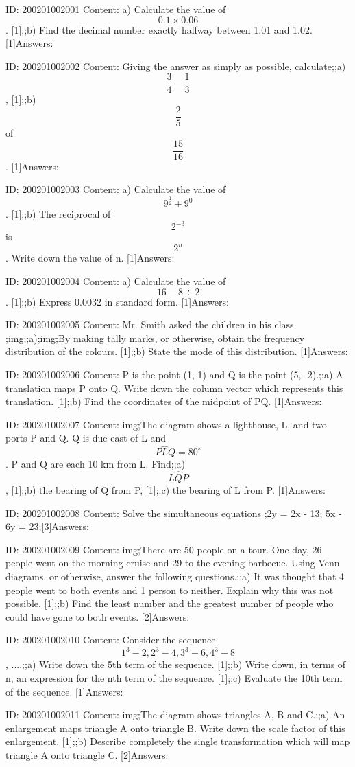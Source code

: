 \documentclass{article}
\begin{document}
ID: 200201002001
Content:
a) Calculate the value of $$0.1 \times 0.06$$. [1];;b) Find the decimal number exactly halfway between 1.01 and 1.02. [1]Answers:

ID: 200201002002
Content:
Giving the answer as simply as possible, calculate;;a) $$\frac{3}{4}-\frac{1}{3}$$, [1];;b) $$\frac{2}{5}$$ of  $$\frac{15}{16}$$. [1]Answers:

ID: 200201002003
Content:
a) Calculate the value of $$9^{\frac{1}{2}}+9^{0} $$. [1];;b) The reciprocal of $$2^{-3} $$ is $$2^{n}$$. Write down the value of n. [1]Answers:

ID: 200201002004
Content:
a) Calculate the value of $$16-8\div 2$$. [1];;b) Express 0.0032 in standard form. [1]Answers:

ID: 200201002005
Content:
Mr. Smith asked the children in his class ;img;;a);img;By making tally marks, or otherwise, obtain the frequency distribution of the colours. [1];;b) State the mode of this distribution. [1]Answers:

ID: 200201002006
Content:
P is the point (1, 1) and Q is the point (5, -2).;;a) A translation maps P onto Q. Write down the column vector which represents this translation. [1];;b) Find the coordinates of the midpoint of PQ. [1]Answers:

ID: 200201002007
Content:
img;The diagram shows a lighthouse, L, and two ports P and Q. Q is due east of L and $$P \hat LQ=80^{\circ}$$. P and Q are each 10 km from L. Find;;a) $$L \hat QP$$, [1];;b) the bearing of Q from P, [1];;c) the bearing of L from P. [1]Answers:

ID: 200201002008
Content:
Solve the simultaneous equations ;2y = 2x - 13; 5x - 6y = 23;[3]Answers:

ID: 200201002009
Content:
img;There are 50 people on a tour. One day, 26 people went on the morning cruise and 29 to the evening barbecue. Using Venn diagrams, or otherwise, answer the following questions.;;a) It was thought that 4 people went to both events and 1 person to neither. Explain why this was not possible. [1];;b) Find the least number and the greatest number of people who could have gone to both events. [2]Answers:

ID: 200201002010
Content:
Consider the sequence $$1^{3} -2, 2^{3} -4, 3^{3} -6, 4^{3} -8$$, ....;;a) Write down the 5th term of the sequence. [1];;b) Write down, in terms of n, an expression for the nth term of the sequence. [1];;c) Evaluate the 10th term of the sequence. [1]Answers:

ID: 200201002011
Content:
img;The diagram shows triangles A, B and C.;;a) An enlargement maps triangle A onto triangle B. Write down the scale factor of this enlargement. [1];;b) Describe completely the single transformation which will map triangle A onto triangle C. [2]Answers:
\end{document}
